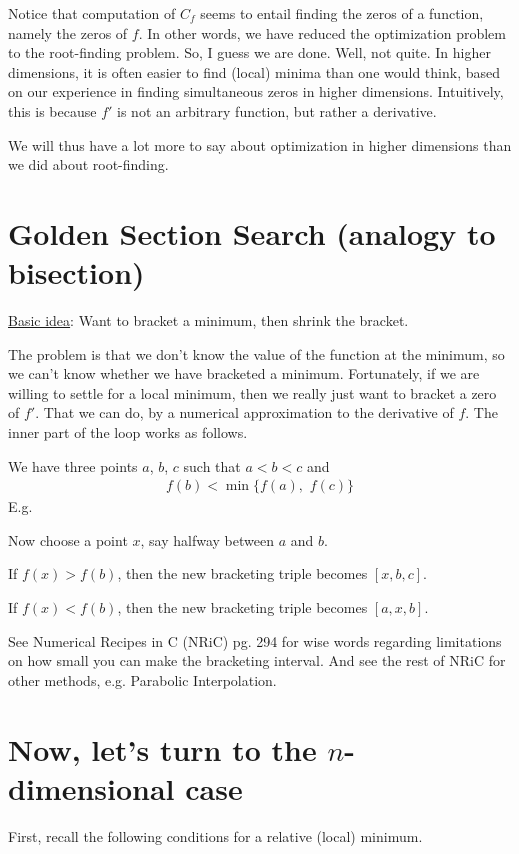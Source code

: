 Notice that computation of $C_f$ seems to entail finding the zeros of a function, namely the zeros of $f$.
In other words, we have reduced the optimization problem to the root-finding problem.
So, I guess we are done.
Well, not quite.
In higher dimensions, it is often easier to find (local) minima than one would think, based on our experience in finding simultaneous zeros in higher dimensions.
Intuitively, this is because $f'$ is not an arbitrary function, but rather a derivative.

We will thus have a lot more to say about optimization in higher dimensions than we did about root-finding.

\section{Golden Section Search (analogy to bisection)}

\underline{Basic idea}: Want to bracket a minimum, then shrink the bracket.

The problem is that we don't know the value of the function at the minimum, so we can't know whether we have bracketed a minimum.
Fortunately, if we are willing to settle for a local minimum, then we really just want to bracket a zero of $f'$.
That we can do, by a numerical approximation to the derivative of $f$.
The inner part of the loop works as follows.

We have three points $a$, $b$, $c$ such that $a < b < c$ and
\begin{align}
  f(b) < \min \{ f(a),\,\,f(c)\}
\end{align}
E.g.

Now choose a point $x$, say halfway between $a$ and $b$.

If $f(x) > f(b)$, then the new bracketing triple becomes $[x, b, c]$.

If $f(x) < f(b)$, then the new bracketing triple becomes $[a, x, b]$.

See Numerical Recipes in C (NRiC) pg. 294 for wise words regarding limitations on how small you can make the bracketing interval.
And see the rest of NRiC for other methods, e.g. Parabolic Interpolation.

\section{Now, let's turn to the $n$-dimensional case}

First, recall the following conditions for a relative (local) minimum.
